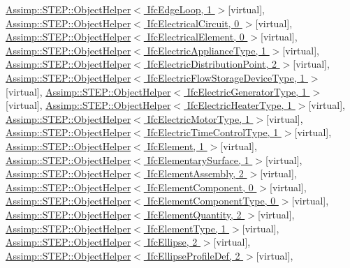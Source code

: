 \hyperlink{struct_assimp_1_1_s_t_e_p_1_1_object_helper}{Assimp\+::\+S\+T\+E\+P\+::\+Object\+Helper$<$ Ifc\+Edge\+Loop, 1 $>$}{\ttfamily  \mbox{[}virtual\mbox{]}}, \hyperlink{struct_assimp_1_1_s_t_e_p_1_1_object_helper}{Assimp\+::\+S\+T\+E\+P\+::\+Object\+Helper$<$ Ifc\+Electrical\+Circuit, 0 $>$}{\ttfamily  \mbox{[}virtual\mbox{]}}, \hyperlink{struct_assimp_1_1_s_t_e_p_1_1_object_helper}{Assimp\+::\+S\+T\+E\+P\+::\+Object\+Helper$<$ Ifc\+Electrical\+Element, 0 $>$}{\ttfamily  \mbox{[}virtual\mbox{]}}, \hyperlink{struct_assimp_1_1_s_t_e_p_1_1_object_helper}{Assimp\+::\+S\+T\+E\+P\+::\+Object\+Helper$<$ Ifc\+Electric\+Appliance\+Type, 1 $>$}{\ttfamily  \mbox{[}virtual\mbox{]}}, \hyperlink{struct_assimp_1_1_s_t_e_p_1_1_object_helper}{Assimp\+::\+S\+T\+E\+P\+::\+Object\+Helper$<$ Ifc\+Electric\+Distribution\+Point, 2 $>$}{\ttfamily  \mbox{[}virtual\mbox{]}}, \hyperlink{struct_assimp_1_1_s_t_e_p_1_1_object_helper}{Assimp\+::\+S\+T\+E\+P\+::\+Object\+Helper$<$ Ifc\+Electric\+Flow\+Storage\+Device\+Type, 1 $>$}{\ttfamily  \mbox{[}virtual\mbox{]}}, \hyperlink{struct_assimp_1_1_s_t_e_p_1_1_object_helper}{Assimp\+::\+S\+T\+E\+P\+::\+Object\+Helper$<$ Ifc\+Electric\+Generator\+Type, 1 $>$}{\ttfamily  \mbox{[}virtual\mbox{]}}, \hyperlink{struct_assimp_1_1_s_t_e_p_1_1_object_helper}{Assimp\+::\+S\+T\+E\+P\+::\+Object\+Helper$<$ Ifc\+Electric\+Heater\+Type, 1 $>$}{\ttfamily  \mbox{[}virtual\mbox{]}}, \hyperlink{struct_assimp_1_1_s_t_e_p_1_1_object_helper}{Assimp\+::\+S\+T\+E\+P\+::\+Object\+Helper$<$ Ifc\+Electric\+Motor\+Type, 1 $>$}{\ttfamily  \mbox{[}virtual\mbox{]}}, \hyperlink{struct_assimp_1_1_s_t_e_p_1_1_object_helper}{Assimp\+::\+S\+T\+E\+P\+::\+Object\+Helper$<$ Ifc\+Electric\+Time\+Control\+Type, 1 $>$}{\ttfamily  \mbox{[}virtual\mbox{]}}, \hyperlink{struct_assimp_1_1_s_t_e_p_1_1_object_helper}{Assimp\+::\+S\+T\+E\+P\+::\+Object\+Helper$<$ Ifc\+Element, 1 $>$}{\ttfamily  \mbox{[}virtual\mbox{]}}, \hyperlink{struct_assimp_1_1_s_t_e_p_1_1_object_helper}{Assimp\+::\+S\+T\+E\+P\+::\+Object\+Helper$<$ Ifc\+Elementary\+Surface, 1 $>$}{\ttfamily  \mbox{[}virtual\mbox{]}}, \hyperlink{struct_assimp_1_1_s_t_e_p_1_1_object_helper}{Assimp\+::\+S\+T\+E\+P\+::\+Object\+Helper$<$ Ifc\+Element\+Assembly, 2 $>$}{\ttfamily  \mbox{[}virtual\mbox{]}}, \hyperlink{struct_assimp_1_1_s_t_e_p_1_1_object_helper}{Assimp\+::\+S\+T\+E\+P\+::\+Object\+Helper$<$ Ifc\+Element\+Component, 0 $>$}{\ttfamily  \mbox{[}virtual\mbox{]}}, \hyperlink{struct_assimp_1_1_s_t_e_p_1_1_object_helper}{Assimp\+::\+S\+T\+E\+P\+::\+Object\+Helper$<$ Ifc\+Element\+Component\+Type, 0 $>$}{\ttfamily  \mbox{[}virtual\mbox{]}}, \hyperlink{struct_assimp_1_1_s_t_e_p_1_1_object_helper}{Assimp\+::\+S\+T\+E\+P\+::\+Object\+Helper$<$ Ifc\+Element\+Quantity, 2 $>$}{\ttfamily  \mbox{[}virtual\mbox{]}}, \hyperlink{struct_assimp_1_1_s_t_e_p_1_1_object_helper}{Assimp\+::\+S\+T\+E\+P\+::\+Object\+Helper$<$ Ifc\+Element\+Type, 1 $>$}{\ttfamily  \mbox{[}virtual\mbox{]}}, \hyperlink{struct_assimp_1_1_s_t_e_p_1_1_object_helper}{Assimp\+::\+S\+T\+E\+P\+::\+Object\+Helper$<$ Ifc\+Ellipse, 2 $>$}{\ttfamily  \mbox{[}virtual\mbox{]}}, \hyperlink{struct_assimp_1_1_s_t_e_p_1_1_object_helper}{Assimp\+::\+S\+T\+E\+P\+::\+Object\+Helper$<$ Ifc\+Ellipse\+Profile\+Def, 2 $>$}{\ttfamily  \mbox{[}virtual\mbox{]}}, 